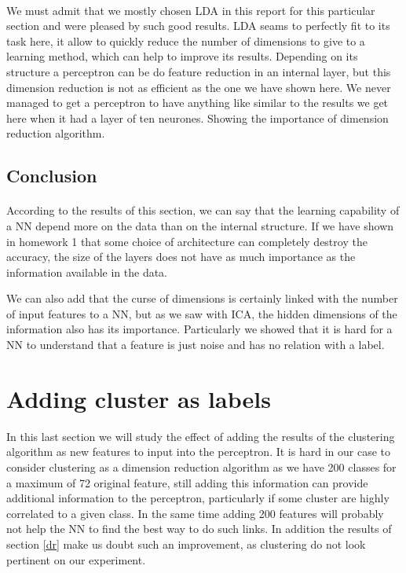 \documentclass[twocolumn,a4paper,10pt]{article}
\begin{document}
\paragraph{}

We must admit that we mostly chosen LDA in this report for this particular
section and were pleased by such good results. LDA seams to perfectly
fit to its task here, it allow to quickly reduce the number of dimensions
to give to a learning method, which can help to improve its results.
Depending on its structure a perceptron can be do feature reduction
in an internal layer, but this dimension reduction is not as efficient
as the one we have shown here. We never managed to get a perceptron
to have anything like similar to the results we get here when it had
a layer of ten neurones. Showing the importance of dimension reduction
algorithm.

\subsection{Conclusion}


\paragraph{}

According to the results of this section, we can say that the learning
capability of a NN depend more on the data than on the internal structure.
If we have shown in homework 1 that some choice of architecture can
completely destroy the accuracy, the size of the layers does not have
as much importance as the information available in the data.

We can also add that the curse of dimensions is certainly linked with
the number of input features to a NN, but as we saw with ICA, the
hidden dimensions of the information also has its importance. Particularly
we showed that it is hard for a NN to understand that a feature is
just noise and has no relation with a label.


\section{Adding cluster as labels}

In this last section we will study the effect of adding the results
of the clustering algorithm as new features to input into the perceptron.
It is hard in our case to consider clustering as a dimension reduction
algorithm as we have 200 classes for a maximum of 72 original feature,
still adding this information can provide additional information to
the perceptron, particularly if some cluster are highly correlated
to a given class. In the same time adding 200 features will probably
not help the NN to find the best way to do such links. In addition
the results of section \ref{dr} make us doubt such an improvement,
as clustering do not look pertinent on our experiment.
\end{document}
